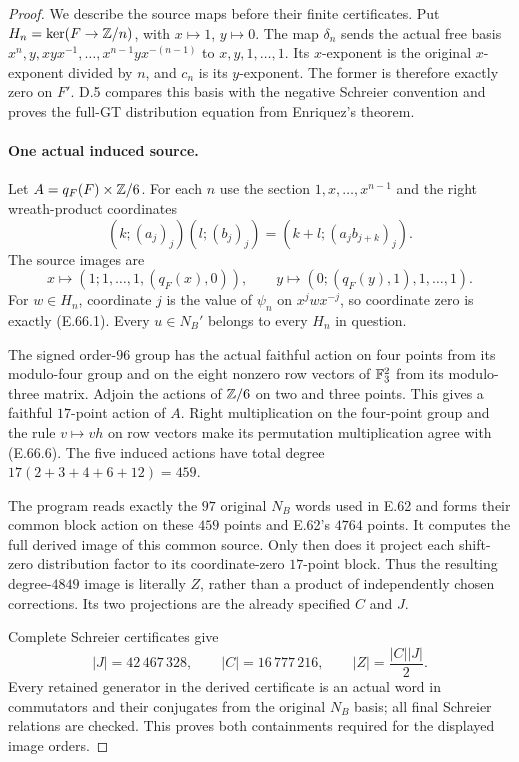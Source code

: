 \begin{proof}
We describe the source maps before their finite certificates.
Put $H_n=\ker(F\to\mathbb Z/n)$, with $x\mapsto1$, $y\mapsto0$.
The map $\delta_n$ sends the actual free basis
$x^n,y,xyx^{-1},\ldots,x^{n-1}yx^{-(n-1)}$ to
$x,y,1,\ldots,1$. Its $x$-exponent is the original
$x$-exponent divided by $n$, and $c_n$ is its $y$-exponent.
The former is therefore exactly zero on $F'$. D.5 compares
this basis with the negative Schreier convention and proves the
full-GT distribution equation from Enriquez's theorem.

\paragraph{One actual induced source.}
Let $A=q_F(F)\times\mathbb Z/6$. For each $n$ use the section
$1,x,\ldots,x^{n-1}$ and the right wreath-product coordinates
\[
 (k;(a_j)_j)(l;(b_j)_j)
       =(k+l;(a_j b_{j+k})_j).
 \tag{E.66.6}
\]
The source images are
\[
 x\longmapsto(1;1,\ldots,1,(q_F(x),0)),\qquad
 y\longmapsto(0;(q_F(y),1),1,\ldots,1).
 \tag{E.66.7}
\]
For $w\in H_n$, coordinate $j$ is the value of $\psi_n$ on
$x^jwx^{-j}$, so coordinate zero is exactly \textup{(E.66.1)}.
Every $u\in N_B'$ belongs to every $H_n$ in question.

The signed order-$96$ group has the actual faithful action on
four points from its modulo-four group and on the eight nonzero
row vectors of $\mathbb F_3^2$ from its modulo-three matrix.
Adjoin the actions of $\mathbb Z/6$ on two and three points.
This gives a faithful $17$-point action of $A$. Right multiplication
on the four-point group and the rule $v\mapsto vh$ on row vectors
make its permutation multiplication agree with
\textup{(E.66.6)}. The five induced actions have total degree
$17(2+3+4+6+12)=459$.

The program reads exactly the $97$ original $N_B$ words used in
E.62 and forms their common block action on these $459$ points
and E.62's $4764$ points. It computes the full derived image of
this common source. Only then does it project each shift-zero
distribution factor to its coordinate-zero $17$-point block.
Thus the resulting degree-$4849$ image is literally $Z$, rather
than a product of independently chosen corrections. Its two
projections are the already specified $C$ and $J$.

Complete Schreier certificates give
\[
 |J|=42\,467\,328,\qquad |C|=16\,777\,216,
 \qquad |Z|=\frac{|C||J|}{2}.
 \tag{E.66.8}
\]
Every retained generator in the derived certificate is an actual
word in commutators and their conjugates from the original
$N_B$ basis; all final Schreier relations are checked. This proves
both containments required for the displayed image orders.


\end{proof}
